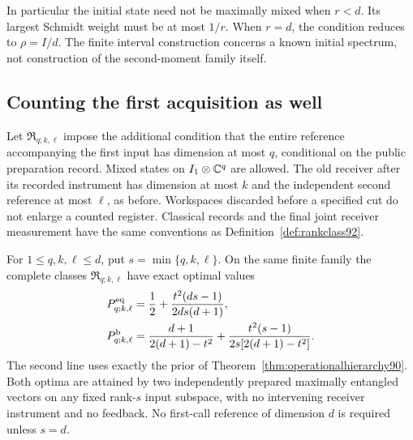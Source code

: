 In particular the initial state need not be maximally mixed when
$r<d$.  Its largest Schmidt weight must be at most $1/r$.
When $r=d$, the condition reduces to $\rho=I/d$.
The finite interval construction concerns a known initial spectrum,
not construction of the second-moment family itself.

\subsection{Counting the first acquisition as well}
Let $\mathfrak R_{q;k,\ell}$ impose the additional condition that the
entire reference accompanying the first input has dimension at most
$q$, conditional on the public preparation record.  Mixed states on
$I_1\otimes\mathbb C^q$ are allowed.  The old receiver after its recorded
instrument has dimension at most $k$ and the independent second
reference at most $\ell$, as before.  Workspaces discarded before a
specified cut do not enlarge a counted register.  Classical records
and the final joint receiver measurement have the same conventions as
Definition~\ref{def:rankclass92}.
\begin{corollary}\label{cor:threecuts93}
For $1\le q,k,\ell\le d$, put $s=\min\{q,k,\ell\}$.
On the same finite family the complete classes
$\mathfrak R_{q;k,\ell}$ have exact optimal values
\begin{equation}\label{eq:threecuts93}
 \begin{split}
 P_{q;k,\ell}^{\rm eq}
      &=\frac12+\frac{t^2(ds-1)}{2ds(d+1)},\\
 P_{q;k,\ell}^{\rm b}
      &=\frac{d+1}{2(d+1)-t^2}
          +\frac{t^2(s-1)}{2s[2(d+1)-t^2]}.
 \end{split}
\end{equation}
The second line uses exactly the prior of
Theorem~\ref{thm:operationalhierarchy90}.  Both optima are attained by
two independently prepared maximally entangled vectors on any fixed
rank-$s$ input subspace, with no intervening receiver instrument and
no feedback.  No first-call reference of dimension $d$ is required
unless $s=d$.
\end{corollary}
